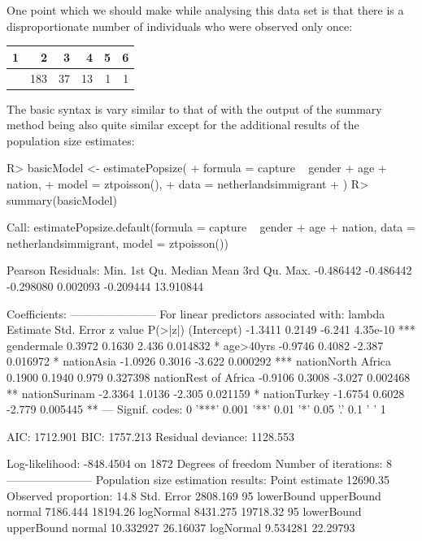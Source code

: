 \documentclass[
]{jss}
\newcommand{\1}{\mathcal{I}} \newcommand{\bZero}{\boldsymbol{0}}
\begin{document}
One point which we should make while analysing this data set is that
there is a disproportionate number of individuals who were observed only
once:


\begin{longtable}[]{@{}rrrrrr@{}}
\toprule\noalign{}
1 & 2 & 3 & 4 & 5 & 6 \\
\midrule\noalign{}
\endhead
\bottomrule\noalign{}
\endlastfoot
1645 & 183 & 37 & 13 & 1 & 1 \\
\end{longtable}

The basic syntax is vary similar to that of  with the output
of the summary method being also quite similar except for the additional
results of the population size estimates:

\begin{CodeChunk}
\begin{CodeInput}
R> basicModel <- estimatePopsize(
+   formula = capture ~ gender + age + nation,
+   model   = ztpoisson(),
+   data    = netherlandsimmigrant
+ )
R> summary(basicModel)
\end{CodeInput}
\begin{CodeOutput}

Call:
estimatePopsize.default(formula = capture ~ gender + age + nation, 
    data = netherlandsimmigrant, model = ztpoisson())

Pearson Residuals:
     Min.   1st Qu.    Median      Mean   3rd Qu.      Max. 
-0.486442 -0.486442 -0.298080  0.002093 -0.209444 13.910844 

Coefficients:
-----------------------
For linear predictors associated with: lambda 
                     Estimate Std. Error z value  P(>|z|)    
(Intercept)           -1.3411     0.2149  -6.241 4.35e-10 ***
gendermale             0.3972     0.1630   2.436 0.014832 *  
age>40yrs             -0.9746     0.4082  -2.387 0.016972 *  
nationAsia            -1.0926     0.3016  -3.622 0.000292 ***
nationNorth Africa     0.1900     0.1940   0.979 0.327398    
nationRest of Africa  -0.9106     0.3008  -3.027 0.002468 ** 
nationSurinam         -2.3364     1.0136  -2.305 0.021159 *  
nationTurkey          -1.6754     0.6028  -2.779 0.005445 ** 
---
Signif. codes:  0 '***' 0.001 '**' 0.01 '*' 0.05 '.' 0.1 ' ' 1

AIC: 1712.901
BIC: 1757.213
Residual deviance: 1128.553

Log-likelihood: -848.4504 on 1872 Degrees of freedom 
Number of iterations: 8
-----------------------
Population size estimation results: 
Point estimate 12690.35
Observed proportion: 14.8%
Std. Error 2808.169
95%
          lowerBound upperBound
normal      7186.444   18194.26
logNormal   8431.275   19718.32
95%
          lowerBound upperBound
normal     10.332927   26.16037
logNormal   9.534281   22.29793
\end{CodeOutput}
\end{CodeChunk}
\end{document}
